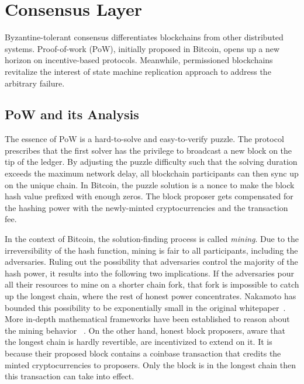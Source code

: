 \section{Consensus Layer}
Byzantine-tolerant consensus differentiates blockchains from other distributed systems. 
Proof-of-work (PoW), initially proposed in Bitcoin, opens up a new horizon on incentive-based protocols. 
Meanwhile, permissioned blockchains revitalize the interest of 
state machine replication approach to address the arbitrary failure. 

\subsection{PoW and its Analysis}
The essence of PoW is a hard-to-solve and easy-to-verify puzzle. 
The protocol prescribes that the first solver has the privilege to broadcast a new block on the tip of the ledger. 
By adjusting the puzzle difficulty such that the solving duration exceeds the maximum network delay,
all blockchain participants can then sync up on the unique chain. 
In Bitcoin, the puzzle solution is a nonce to make the block hash value prefixed with enough zeros. 
The block proposer gets compensated for the hashing power with the newly-minted cryptocurrencies and the transaction fee. 

In the context of Bitcoin, the solution-finding process is called \textit{mining}. 
Due to the irreversibility of the hash function, mining is fair to all participants, including the adversaries. 
Ruling out the possibility that adversaries control the majority of the hash power, it results into the following two implications.
If the adversaries pour all their resources to mine on a shorter chain fork, 
that fork is impossible to catch up the longest chain, where the rest of honest power concentrates. 
Nakamoto has bounded this possibility to be exponentially small in the original whitepaper~\cite{nakamoto2019bitcoin}.
More in-depth mathematical frameworks have been established to reason about the mining behavior ~\cite{gervais2016security,kiayias2015speed,ren2019analysis,miller2014anonymous,garay2015bitcoin}. 
On the other hand, honest block proposers, aware that the longest chain is hardly revertible, are incentivized to extend on it. 
It is because their proposed block contains a coinbase transaction that credits the minted cryptocurrencies to proposers. 
Only the block is in the longest chain then this transaction can take into effect. 

